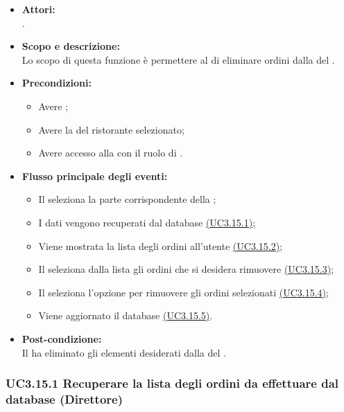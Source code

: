 \begin{itemize}
	\item \textbf{Attori:}
	\\.
	\item \textbf{Scopo e descrizione:} 
	\\Lo scopo di questa funzione è permettere al  di eliminare ordini dalla  del .
	\item \textbf{Precondizioni:}
	\begin{itemize}
		\item Avere ;
		\item Avere la  del ristorante selezionato;
		\item Avere accesso alla  con il ruolo di .
	\end{itemize}
	\item \textbf{Flusso principale degli eventi:}
	\begin{itemize}
		\item Il  seleziona la parte corrispondente della ;
		\item I dati vengono recuperati dal database \hyperref[UC3.15.1]{(UC3.15.1)};
		\item Viene mostrata la lista degli ordini all'utente \hyperref[UC3.15.2]{(UC3.15.2)};
		\item Il  seleziona dalla lista gli ordini che si desidera rimuovere \hyperref[UC3.15.3]{(UC3.15.3)};
		\item Il  seleziona l'opzione per rimuovere gli ordini selezionati \hyperref[UC3.15.4]{(UC3.15.4)};
		\item Viene aggiornato il database \hyperref[UC3.15.5]{(UC3.15.5)}.
	\end{itemize}
	\item \textbf{Post-condizione:}
	\\Il {} ha eliminato gli elementi desiderati dalla  del .
\end{itemize}

\subsubsection{UC3.15.1 Recuperare la lista degli ordini da effettuare dal database (Direttore)} \label{UC3.15.1}

